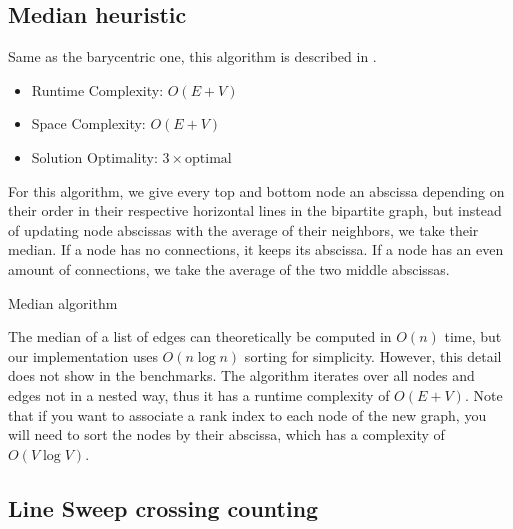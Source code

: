 \documentclass[a4paper]{article}
\begin{document}
\subsection{Median heuristic}

Same as the barycentric one, this algorithm is described in \cite{edgecrossings1994}.

\begin{itemize}
	\item Runtime Complexity: $O(E + V)$
	\item Space Complexity: $O(E + V)$
	\item Solution Optimality: $3 \times \text{optimal}$
\end{itemize}

For this algorithm, we give every top and bottom node an abscissa depending on their order in their respective horizontal lines in the bipartite graph,
but instead of updating node abscissas with the average of their neighbors, we take their median. If a node has no connections, it keeps its abscissa. If a node has an even amount of connections, we take the average of the two middle abscissas.\\

\begin{algorithm}[H]
	\caption{Median algorithm}
	\DontPrintSemicolon
	\BlankLine



\end{algorithm}

The median of a list of edges can theoretically be computed in $O(n)$ time, but our implementation uses $O(n \log n)$ sorting for simplicity.
However, this detail does not show in the benchmarks.
The algorithm iterates over all nodes and edges not in a nested way, thus it has a runtime complexity of $O(E + V)$.
Note that if you want to associate a rank index to each node of the new graph, you will need to sort the nodes by their abscissa, which has a complexity of $O(V \log V)$.

\subsection{Line Sweep crossing counting}
\end{document}
